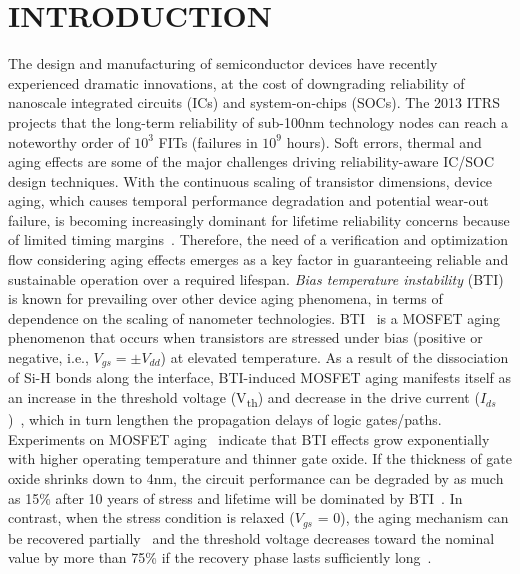 \section{INTRODUCTION}
The design and manufacturing of semiconductor devices have recently experienced dramatic innovations, at the cost of downgrading reliability of nanoscale integrated circuits (ICs) and system-on-chips (SOCs). The 2013 ITRS~\cite{itrs2013} projects that the long-term reliability of sub-100nm technology nodes can reach a noteworthy order of $10^3$ FITs (failures in $10^9$ hours). Soft errors, thermal and aging effects are some of the major challenges driving reliability-aware IC/SOC design techniques. With the continuous scaling of transistor dimensions, device aging, which causes temporal performance degradation and potential wear-out failure, is becoming increasingly dominant for lifetime reliability concerns because of limited timing margins~\cite{mcpherson2006reliability}. Therefore, the need of a verification and optimization flow considering aging effects emerges as a key factor in guaranteeing reliable and sustainable operation over a required lifespan.
\textit{Bias temperature instability} (BTI) is known for prevailing over other device aging phenomena, in terms of dependence on the scaling of nanometer technologies. BTI~\cite{schroder2003negative} is a MOSFET aging phenomenon that occurs when transistors are stressed under bias (positive or negative, i.e., $V_{gs} = \pm V_{dd}$) at elevated temperature. As a result of the dissociation of Si-H bonds along the  interface, BTI-induced MOSFET aging manifests itself as an increase in the threshold voltage (V\textsubscript{th}) and decrease in the drive current ($I_{ds}$)~\cite{stathis2006negative}, which in turn lengthen the propagation delays of logic gates/paths. Experiments on MOSFET aging~\cite{chakravarthi2004comprehensive} indicate that BTI effects grow exponentially with higher operating temperature and thinner gate oxide. If the thickness of gate oxide shrinks down to 4nm, the circuit performance can be degraded by as much as 15\% after 10 years of stress and lifetime will be dominated by BTI~\cite{kimizuka1999impact}. In contrast, when the stress condition is relaxed ($V_{gs}$ = 0), the aging mechanism can be recovered partially~\cite{kumar2006analytical} and the threshold voltage decreases toward the nominal value by more than 75\% if the recovery phase lasts sufficiently long~\cite{wang2010impact}.
